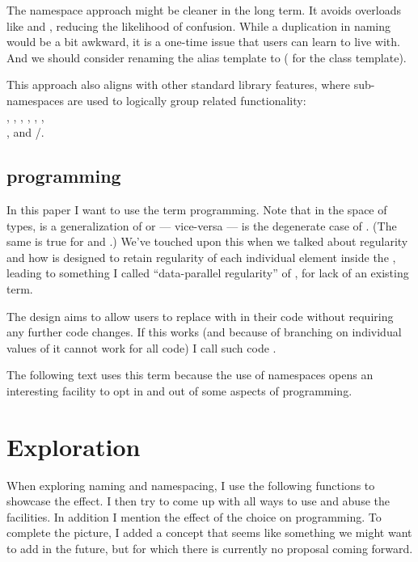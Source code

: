 The \std{} namespace approach might be cleaner in the long term.
It avoids overloads like  and , reducing
the likelihood of confusion.
While a  duplication in naming would be a bit awkward, it is a
one-time issue that users can learn to live with.
And we should consider renaming the alias template to
\std{} (\std{} for the
class template).

This approach also aligns with other \CC{} standard library features,
where sub-namespaces are used to logically group related functionality:\\
\std{},
\std{},
\std{},
\std{},
\std{},
\std{},\\
\std{}, and
\std{}/\std{}.

\subsection{\simdgeneric programming}

In this paper I want to use the term \emph{\simdgeneric} programming.
Note that in the space of types, \simdT is a generalization of  or ---
vice-versa ---  is the degenerate case of \simdT.
(The same is true for \mask and .)
We've touched upon this when we talked about regularity and how \simdT is
designed to retain regularity of each individual element inside the \simd,
leading to something I called “data-parallel regularity” of \simdT, for lack of
an existing term.

The  design aims to allow users to replace  with \simdT in
their code without requiring any further code changes.
If this works (and because of branching on individual values of  it
cannot work for all code) I call such code \simdgeneric.

The following text uses this term because the use of namespaces opens an
interesting facility to opt in and out of some aspects of \simdgeneric
programming.

\section{Exploration}

When exploring naming and namespacing, I use the following functions to showcase the effect.
I then try to come up with all ways to use and abuse the facilities.
In addition I mention the effect of the choice on \simdgeneric programming.
To complete the picture, I added a concept that seems like something we might
want to add in the future, but for which there is currently no proposal coming
forward.

